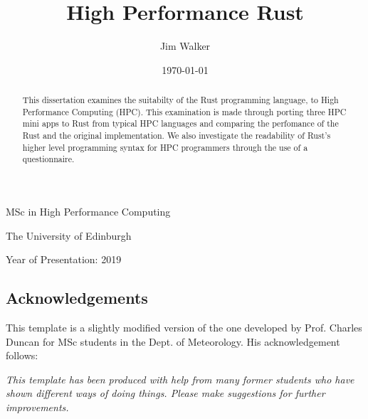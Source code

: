 \documentclass[12pt,a4paper]{report}
\begin{document}




\title{High Performance Rust}
\author{Jim Walker}
\date{\today}

\makeEPCCtitle

\thispagestyle{empty}

\vspace{12cm}

\begin{center}

\large{MSc in High Performance Computing}

\large{The University of Edinburgh}

\large{Year of Presentation: 2019}

\end{center}

\newpage

\begin{abstract}
This dissertation examines the suitabilty of the Rust programming language, to High Performance Computing (HPC). This examination is made through porting three HPC mini apps to Rust from typical HPC languages and comparing the perfomance of the Rust and the original implementation. We also investigate the readability of Rust's higher level programming syntax for HPC programmers through the use of a questionnaire.
\end{abstract}


\tableofcontents
\listoftables
\listoffigures

\begin{titlepage}
\vspace*{2in}
\section*{Acknowledgements}

This template is a slightly modified version of the one developed by
Prof. Charles Duncan for MSc students in the Dept. of Meteorology. His
acknowledgement follows:

{\em This template has been produced with help from many former students who
have shown different ways of doing things. Please make suggestions for
further improvements.}

\end{titlepage}
\end{document}

